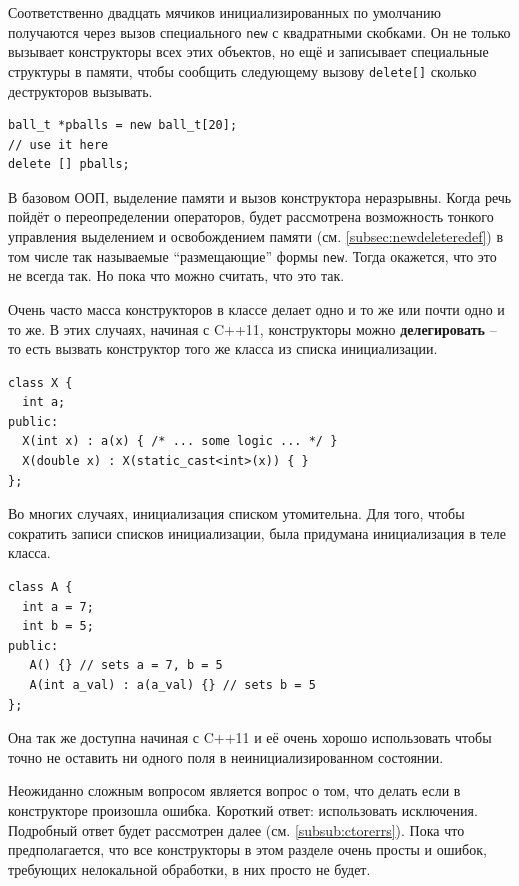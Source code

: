 \documentclass[a4paper,12pt,oneside]{book}
\begin{document}
Соответственно двадцать мячиков инициализированных по умолчанию получаются через вызов специального \lstinline!new! с квадратными скобками. Он не только вызывает конструкторы всех этих объектов, но ещё и записывает специальные структуры в памяти, чтобы сообщить следующему вызову \lstinline!delete[]! сколько деструкторов вызывать.

\begin{lstlisting}
ball_t *pballs = new ball_t[20];
// use it here
delete [] pballs;
\end{lstlisting}

В базовом ООП, выделение памяти и вызов конструктора неразрывны. Когда речь пойдёт о переопределении операторов, будет рассмотрена возможность тонкого управления выделением и освобождением памяти (см. \ref{subsec:newdeleteredef}) в том числе так называемые ``размещающие'' формы \lstinline!new!. Тогда окажется, что это не всегда так. Но пока что можно считать, что это так.

Очень часто масса конструкторов в классе делает одно и то же или почти одно и то же. В этих случаях, начиная с C++11, конструкторы можно \textbf{делегировать} -- то есть вызвать конструктор того же класса из списка инициализации.

\begin{lstlisting}
class X {
  int a;
public:
  X(int x) : a(x) { /* ... some logic ... */ }
  X(double x) : X(static_cast<int>(x)) { }
};
\end{lstlisting}

Во многих случаях, инициализация списком утомительна. Для того, чтобы сократить записи списков инициализации, была придумана инициализация в теле класса.

\begin{lstlisting}
class A {
  int a = 7;
  int b = 5;  
public:
   A() {} // sets a = 7, b = 5
   A(int a_val) : a(a_val) {} // sets b = 5
};
\end{lstlisting}

Она так же доступна начиная с C++11 и её очень хорошо использовать чтобы точно не оставить ни одного поля в неинициализированном состоянии.

Неожиданно сложным вопросом является вопрос о том, что делать если в конструкторе произошла ошибка. Короткий ответ: использовать исключения. Подробный ответ будет рассмотрен далее (см. \ref{subsub:ctorerrs}). Пока что предполагается, что все конструкторы в этом разделе очень просты и ошибок, требующих нелокальной обработки, в них просто не будет.
\end{document}
